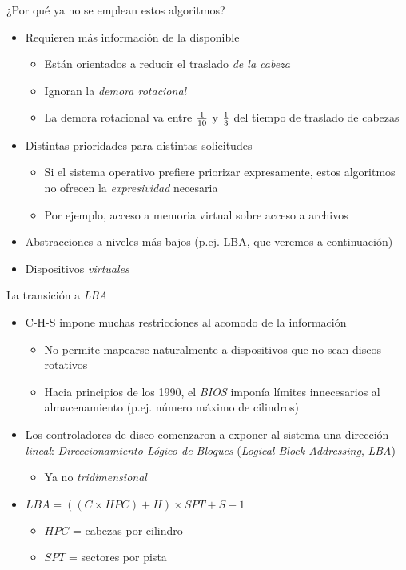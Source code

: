\documentclass[presentation]{beamer}
\begin{document}
\begin{frame}[label={sec:orga05ac56}]{¿Por qué ya no se emplean estos algoritmos?}
\begin{itemize}
\item Requieren más información de la disponible
\begin{itemize}
\item Están orientados a reducir el traslado \emph{de la cabeza}
\item Ignoran la \emph{demora rotacional}
\item La demora rotacional va entre \(1 \over 10\) y \(1 \over 3\) del
tiempo de traslado de cabezas
\end{itemize}
\item Distintas prioridades para distintas solicitudes
\begin{itemize}
\item Si el sistema operativo prefiere priorizar expresamente, estos
algoritmos no ofrecen la \emph{expresividad} necesaria
\item Por ejemplo, acceso a memoria virtual sobre acceso a archivos
\end{itemize}
\item Abstracciones a niveles más bajos (p.ej. LBA, que veremos a
continuación)
\item Dispositivos \emph{virtuales}
\end{itemize}
\end{frame}

\begin{frame}[label={sec:org7303e43}]{La transición a \emph{LBA}}
\begin{itemize}
\item C-H-S impone muchas restricciones al acomodo de la información
\begin{itemize}
\item No permite mapearse naturalmente a dispositivos que no sean discos
rotativos
\item Hacia principios de los 1990, el \emph{BIOS} imponía límites
innecesarios al almacenamiento (p.ej. número máximo de cilindros)
\end{itemize}
\item Los controladores de disco comenzaron a exponer al sistema una
dirección \emph{lineal}: \emph{Direccionamiento Lógico de Bloques} (\emph{Logical
Block Addressing}, \emph{LBA})
\begin{itemize}
\item Ya no \emph{tridimensional}
\end{itemize}
\item \(LBA = ((C \times HPC) + H) \times SPT + S - 1\)
\begin{itemize}
\item \(HPC\) = cabezas por cilindro
\item \(SPT\) = sectores por pista
\end{itemize}
\end{itemize}
\end{frame}
\end{document}
